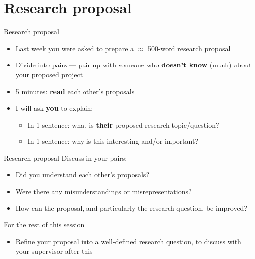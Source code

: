 \part{Research proposal}
\frame{\partpage}

\begin{frame}{Research proposal}
    \begin{itemize}
        \pause\item Last week you were asked to prepare a $\approx$ 500-word research proposal
        \pause\item Divide into pairs --- pair up with someone who \textbf{doesn't know} (much) about your proposed project
        \pause\item 5 minutes: \textbf{read} each other's proposals
        \pause\item I will ask \textbf{you} to explain:
            \begin{itemize}
                \pause\item In 1 sentence: what is \textbf{their} proposed research topic/question?
                \pause\item In 1 sentence: why is this interesting and/or important?
            \end{itemize}
    \end{itemize}
\end{frame}

\begin{frame}{Research proposal}
    Discuss in your pairs:
    \begin{itemize}
        \pause\item Did you understand each other's proposals?
        \pause\item Were there any misunderstandings or misrepresentations?
        \pause\item How can the proposal, and particularly the research question, be improved?
    \end{itemize}
    For the rest of this session:
    \begin{itemize}
        \pause\item Refine your proposal into a well-defined research question,
             to discuss with your supervisor after this
    \end{itemize}
\end{frame}

